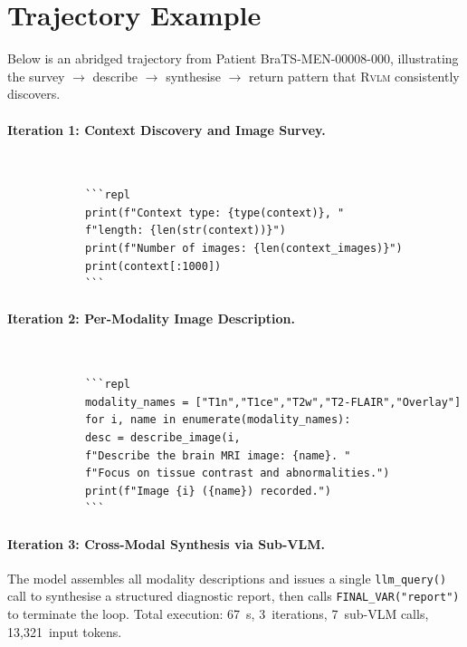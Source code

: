 \documentclass{article}
\newcommand{\RVLM}{\textsc{Rvlm}}
\begin{document}
	\section{Trajectory Example}
	\label{appx:trajectory}
	
	Below is an abridged trajectory from Patient BraTS-MEN-00008-000,
	illustrating the survey $\rightarrow$ describe $\rightarrow$ synthesise
	$\rightarrow$ return pattern that \RVLM{} consistently discovers.
	
	\paragraph{Iteration 1: Context Discovery and Image Survey.}\mbox{}\\
	\begin{tcolorbox}[colback=llm,colframe=PastelCyan!80,
		title={\small Model Output (Iteration 1)},
		fonttitle=\small\bfseries]
		\small
		\begin{verbatim}
			```repl
			print(f"Context type: {type(context)}, "
			f"length: {len(str(context))}")
			print(f"Number of images: {len(context_images)}")
			print(context[:1000])
			```
		\end{verbatim}
	\end{tcolorbox}
	
	\paragraph{Iteration 2: Per-Modality Image Description.}\mbox{}\\
	\begin{tcolorbox}[colback=llm,colframe=PastelCyan!80,
		title={\small Model Output (Iteration 2)},
		fonttitle=\small\bfseries]
		\small
		\begin{verbatim}
			```repl
			modality_names = ["T1n","T1ce","T2w","T2-FLAIR","Overlay"]
			for i, name in enumerate(modality_names):
			desc = describe_image(i,
			f"Describe the brain MRI image: {name}. "
			f"Focus on tissue contrast and abnormalities.")
			print(f"Image {i} ({name}) recorded.")
			```
		\end{verbatim}
	\end{tcolorbox}
	
	\paragraph{Iteration 3: Cross-Modal Synthesis via Sub-VLM.}
	The model assembles all modality descriptions and issues a single
	\texttt{llm\_query()} call to synthesise a structured diagnostic report,
	then calls \texttt{FINAL\_VAR("report")} to terminate the loop.
	Total execution: 67~s, 3~iterations, 7~sub-VLM calls, 13,321~input tokens.
	
	\newpage
	
	
	
\end{document}
